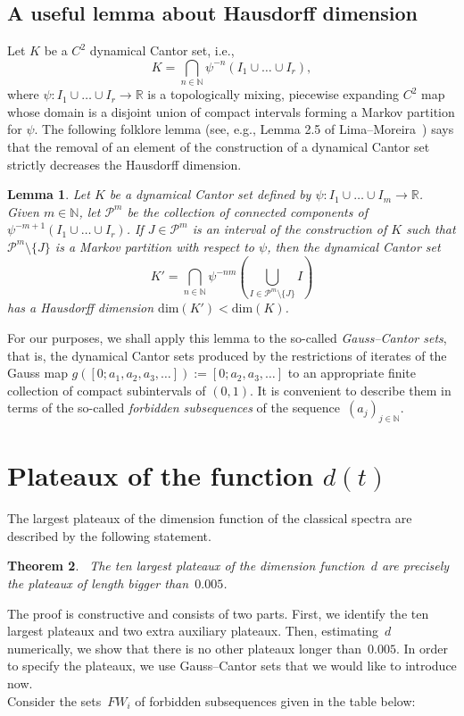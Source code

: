 \documentclass[10pt]{amsart}
\newtheorem{theorem}{Theorem}[section]
\newtheorem{lemma}[theorem]{Lemma}
\numberwithin{equation}{section}
\theoremstyle{definition}
\begin{document}
\subsection{A useful lemma about Hausdorff dimension} Let $K$ be a $C^2$ dynamical Cantor set, i.e., 
$$K=\bigcap\limits_{n\in\mathbb{N}}\psi^{-n}(I_1\cup\dots\cup I_r),$$ 
where $\psi:I_1\cup\dots\cup I_r\to \mathbb{R}$ is a topologically mixing,
piecewise expanding $C^2$ map whose domain is a disjoint union of compact
intervals forming a Markov partition for $\psi$. The following folklore lemma
(see, e.g., Lemma 2.5 of Lima--Moreira~\cite{LM}) says that the removal of an element of the construction of a dynamical Cantor set strictly decreases the Hausdorff dimension. 

\begin{lemma}\label{l.dimension-drop} Let $K$ be a dynamical Cantor set defined by $\psi:I_1\cup\dots\cup I_m\to\mathbb{R}$. Given $m\in\mathbb{N}$, let $\mathcal{P}^m$ be the collection of connected components of $\psi^{-m+1}(I_1\cup\dots\cup I_r)$. If $J\in\mathcal{P}^m$ is an interval of the construction of $K$ such that $\mathcal{P}^m\setminus\{J\}$ is a Markov partition with respect to $\psi$, then the dynamical Cantor set 
$$K'=\bigcap\limits_{n\in\mathbb{N}} \psi^{-nm}\left(\bigcup\limits_{I\in\mathcal{P}^m\setminus\{J\}}I\right)$$ 
has a Hausdorff dimension $\textrm{dim}(K') < \textrm{dim}(K)$. 
\end{lemma} 

For our purposes, we shall apply this lemma to the so-called
\emph{Gauss--Cantor sets}, that is, the dynamical Cantor sets produced by the
restrictions of iterates of the Gauss map
$g([0;a_1,a_2,a_3,\dots]):=[0;a_2,a_3,\dots]$ to an appropriate finite
collection of compact subintervals of $(0,1)$. It is convenient to describe them
in terms of the so-called \emph{forbidden subsequences} of the
sequence~$(a_j)_{j\in \mathbb N}$.


\section{Plateaux of the function $d(t)$}\label{s.plateaux} 

The largest plateaux of the dimension function of the classical spectra are described by the following statement. 
\begin{theorem}~\label{t.A}
The ten largest plateaux of the dimension function~$d$ are precisely the
plateaux of length bigger than~$0.005$. 
\end{theorem}
The proof is constructive and consists of two parts. First, we identify the ten
largest plateaux and two extra auxiliary plateaux. Then, estimating~$d$
numerically, we show that there is no other plateaux longer than~$0.005$. In
order to specify the plateaux, we use Gauss--Cantor sets that we would like
to introduce now. \\ 
\indent Consider the sets~$FW_i$ of forbidden subsequences given in the table
below:
\end{document}
